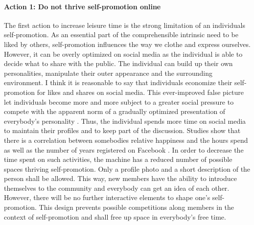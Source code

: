 \documentclass[12pt,numbers=noenddot,parskip,bibliography=totocnumbered,listof=totocnumbered]{scrreprt}
\begin{document}
\paragraph{Action 1: Do not thrive self-promotion online}
The first action to increase leisure time is the strong limitation of an individuals self-promotion. As an essential part of the comprehensible intrinsic need to be liked by others, self-promotion influences the way we clothe and express ourselves. However, it can be overly optimized on social media as the individual is able to decide what to share with the public. The individual can build up their own personalities, manipulate their outer appearance and the surrounding environment. I think it is reasonable to say that individuals economize their self-promotion for likes and shares on social media. This ever-improved false picture let individuals become more and more subject to a greater social pressure to compete with the apparent norm of a gradually optimized presentation of everybody's personality \citep{jay2012}. Thus, the individual spends more time on social media to maintain their profiles and to keep part of the discussion. Studies show that there is a correlation between somebodies relative happiness and the hours spend as well as the number of years registered on Facebook \citep[p.119]{chou2012}.\newline
In order to decrease the time spent on such activities, the machine has a reduced number of possible spaces thriving self-promotion. Only a profile photo and a short description of the person shall be allowed. This way, new members have the ability to introduce themselves to the community and everybody can get an idea of each other. However, there will be no further interactive elements to shape one's self-promotion. This design prevents possible competitions along members in the context of self-promotion and shall free up space in everybody's free time.
\end{document}
